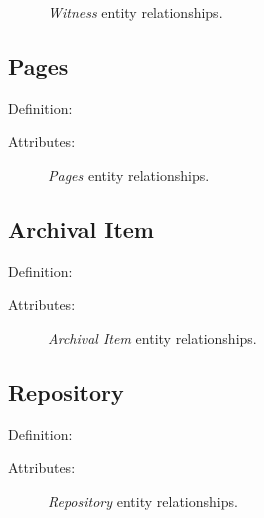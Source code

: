 \begin{figure}[ht]
    \begin{center}
        
    \end{center}
\label{fig:WitnessER}
\caption{\textit{Witness} entity relationships.}
\end{figure}


\subsection{Pages}

Definition: 

\vspace{1em}
\noindent Attributes:

\begin{figure}[ht]
    \begin{center}
        
    \end{center}
\label{fig:PagesER}
\caption{\textit{Pages} entity relationships.}
\end{figure}


\subsection{Archival Item}

Definition: 

\vspace{1em}
\noindent Attributes:

\begin{figure}[ht]
    \begin{center}
        
    \end{center}
\label{fig:ArchivalER}
\caption{\textit{Archival Item} entity relationships.}
\end{figure}


\subsection{Repository}

Definition: 

\vspace{1em}
\noindent Attributes:

\begin{figure}[ht]
    \begin{center}
        
    \end{center}
\label{fig:RepositoryER}
\caption{\textit{Repository} entity relationships.}
\end{figure}

